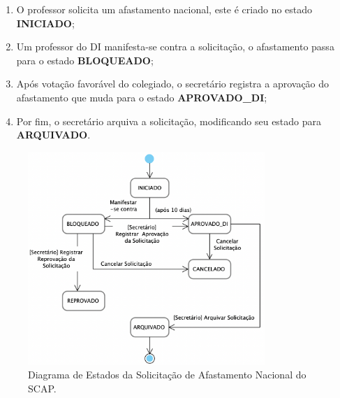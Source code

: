 \begin{enumerate}
    \item O professor solicita um afastamento nacional, este é criado no estado \textbf{INICIADO};
    \item Um professor do DI manifesta-se contra a solicitação, o afastamento passa para o estado \textbf{BLOQUEADO};
    \item Após votação favorável do colegiado, o secretário registra a aprovação do afastamento que muda para o estado \textbf{APROVADO\_DI};
    \item Por fim, o secretário arquiva a solicitação, modificando seu estado para \textbf{ARQUIVADO}.
\end{enumerate}

\begin{figure}[h!]
    \centering
    \includegraphics[width=0.8\textwidth]{figuras/fig-diagrama-estado-nacional.png}
    \caption{Diagrama de Estados da Solicitação de Afastamento Nacional do SCAP.}
    \label{fig-diagrama-estado-nacional}
\end{figure}


